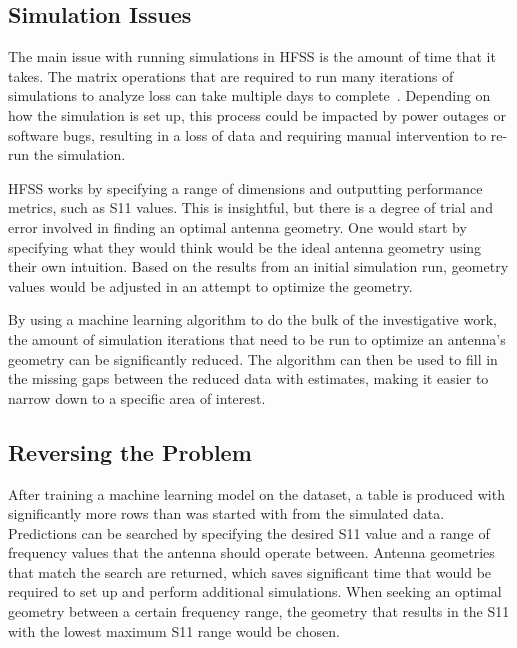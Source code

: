 \documentclass[lettersize,journal]{IEEEtran}
\begin{document}
\subsection{Simulation Issues}
The main issue with running simulations in HFSS is the amount of time that it takes. The matrix operations that are required to run many iterations of simulations to analyze loss can take multiple days to complete~\cite{john_antenna_2009}. Depending on how the simulation is set up, this process could be impacted by power outages or software bugs, resulting in a loss of data and requiring manual intervention to re-run the simulation. 

HFSS works by specifying a range of dimensions and outputting performance metrics, such as S11 values. This is insightful, but there is a degree of trial and error involved in finding an optimal antenna geometry. One would start by specifying what they would think would be the ideal antenna geometry using their own intuition. Based on the results from an initial simulation run, geometry values would be adjusted in an attempt to optimize the geometry.

By using a machine learning algorithm to do the bulk of the investigative work, the amount of simulation iterations that need to be run to optimize an antenna's geometry can be significantly reduced. The algorithm can then be used to fill in the missing gaps between the reduced data with estimates, making it easier to narrow down to a specific area of interest. 

\subsection{Reversing the Problem}
After training a machine learning model on the dataset, a table is produced with significantly more rows than was started with from the simulated data. Predictions can be searched by specifying the desired S11 value and a range of frequency values that the antenna should operate between. Antenna geometries that match the search are returned, which saves significant time that would be required to set up and perform additional simulations. When seeking an optimal geometry between a certain frequency range, the geometry that results in the S11 with the lowest maximum S11 range would be chosen.
\end{document}
